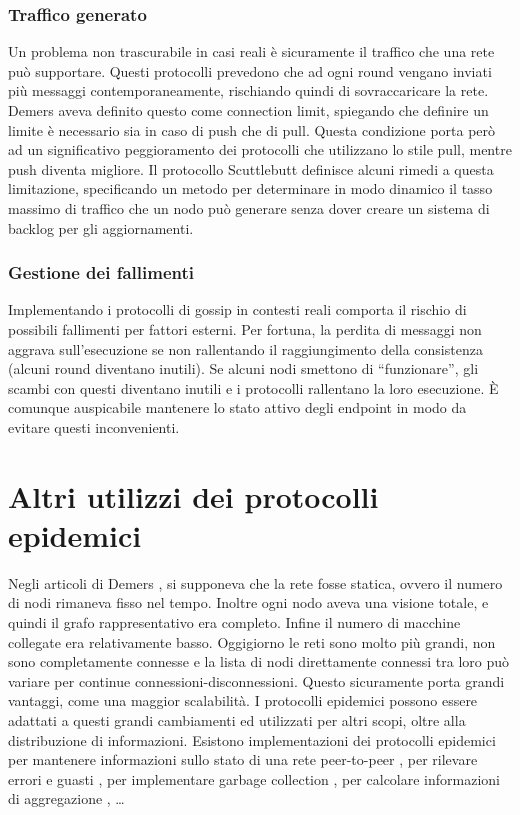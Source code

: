 \subsubsection{Traffico generato}
Un problema non trascurabile in casi reali è sicuramente il traffico che una rete può supportare. Questi protocolli prevedono che ad ogni round vengano inviati più messaggi contemporaneamente, rischiando quindi di sovraccaricare la rete. Demers aveva definito questo come connection limit, spiegando che definire un limite è necessario sia in caso di push che di pull. Questa condizione porta però ad un significativo peggioramento dei protocolli che utilizzano lo stile pull, mentre push diventa migliore. Il protocollo Scuttlebutt \cite{flowgossip} definisce alcuni rimedi a questa limitazione, specificando un metodo per determinare in modo dinamico il tasso massimo di traffico che un nodo può generare senza dover creare un sistema di backlog per gli aggiornamenti. 

\subsubsection{Gestione dei fallimenti}
Implementando i protocolli di gossip in contesti reali comporta il rischio di possibili fallimenti per fattori esterni. Per fortuna, la perdita di messaggi non aggrava sull’esecuzione se non rallentando il raggiungimento della consistenza (alcuni round diventano inutili). Se alcuni nodi smettono di “funzionare”, gli scambi con questi diventano inutili e i protocolli rallentano la loro esecuzione. È comunque auspicabile mantenere lo stato attivo degli endpoint in modo da evitare questi inconvenienti.

\section{Altri utilizzi dei protocolli epidemici}

Negli articoli di Demers \cite{demers}, si supponeva che la rete fosse statica, ovvero il numero di nodi rimaneva fisso nel tempo. Inoltre ogni nodo aveva una visione totale, e quindi il grafo rappresentativo era completo. Infine il numero di macchine collegate era relativamente basso.
Oggigiorno le reti sono molto più grandi, non sono completamente connesse e la lista di nodi direttamente connessi tra loro può variare per continue connessioni-disconnessioni. Questo sicuramente porta grandi vantaggi, come una maggior scalabilità. I protocolli epidemici possono essere adattati a questi grandi cambiamenti ed utilizzati per altri scopi, oltre alla distribuzione di informazioni. Esistono implementazioni dei protocolli epidemici per mantenere informazioni sullo stato di una rete peer-to-peer \cite{newscast}, per rilevare errori e guasti \cite{swim}, per implementare garbage collection \cite{garbage_collection}, per calcolare informazioni di aggregazione \cite{aggregation}, …
